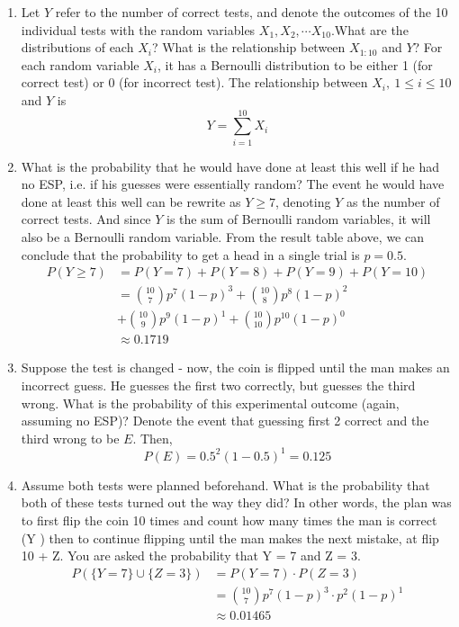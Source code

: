 \documentclass[preprint,12pt]{elsarticle}
\begin{document}
    \begin{enumerate}[label=\alph*]
    \item Let $Y$ refer to the number of correct tests, and denote the outcomes of the 10 individual tests
    with the random variables $X_1,X_2, \cdots X_10$.What are the distributions of each $X_i$? What is the 
    relationship between $X_{1:10}$ and $Y$?
    For each random variable $X_i$, it has a Bernoulli distribution to be either 1 (for correct test) or 0
    (for incorrect test). The relationship between $X_i,\ 1\leq i\leq 10$ and $Y$ is 
    \begin{equation*}
        Y = \sum_{i=1}^{10} X_i
    \end{equation*}

    \item What is the probability that he would have done at least this well if he had no ESP, i.e. if his guesses
    were essentially random?
    The event he would have done at least this well can be rewrite as $Y \geq 7$, denoting $Y$ as the number of 
    correct tests. And since $Y$ is the sum of Bernoulli random variables, it will also be a Bernoulli random variable.
    From the result table above, we can conclude that the probability to get a head in a single trial is $p = 0.5$.
    \begin{align*}
        P(Y \geq 7)     &= P(Y=7) + P(Y=8) + P(Y=9) + P(Y=10) \\
                        &= \binom{10}{7}p^7(1-p)^3 + \binom{10}{8}p^8(1-p)^2 \\
                        &   + \binom{10}{9}p^9(1-p)^1 + \binom{10}{10}p^10(1-p)^0 \\
                        &\approx 0.1719
    \end{align*}

    \item Suppose the test is changed - now, the coin is flipped until the man makes an incorrect guess.
    He guesses the first two correctly, but guesses the third wrong. What is the probability of this
    experimental outcome (again, assuming no ESP)?
    Denote the event that guessing first 2 correct and the third wrong to be $E$. Then,
    \begin{equation*}
        P(E) = 0.5^2 (1-0.5)^1 = 0.125
    \end{equation*}

    \item Assume both tests were planned beforehand. What is the probability that both of these tests turned
    out the way they did? In other words, the plan was to first flip the coin 10 times and count how many times 
    the man is correct (Y ) then to continue flipping until the man makes the next mistake, at flip 10 + Z. 
    You are asked the probability that Y = 7 and Z = 3.
    \begin{align*}
        P(\{Y=7\}\cup \{Z=3\})  &= P(Y=7) \cdot P(Z=3) \\
                            &= \binom{10}{7}p^7(1-p)^3 \cdot p^2 (1-p)^1 \\
                            &\approx 0.01465
    \end{align*}
    \end{enumerate}
\end{document}
